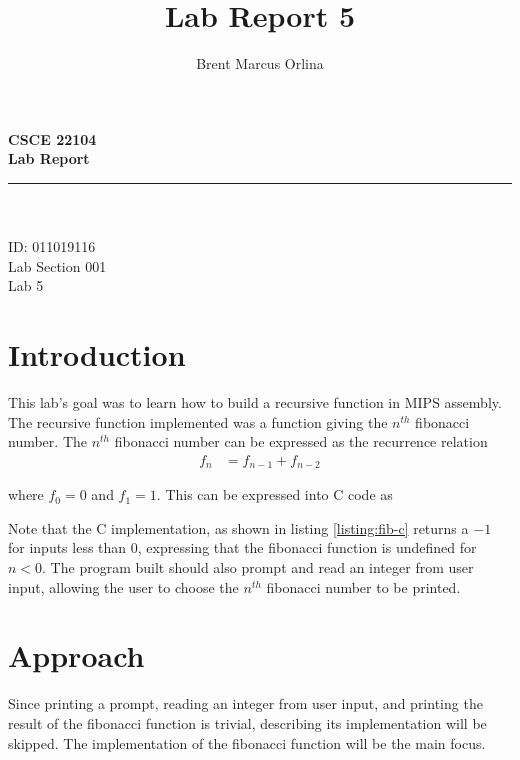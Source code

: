 \documentclass[11pt]{report}
\makeatletter
\newcommand{\@labsection}{000}
\newcommand{\labsection}[1]{
    \renewcommand{\@labsection}{#1}
}
\newcommand{\@labnumber}{0}
\newcommand{\labnumber}[1]{
    \renewcommand{\@labnumber}{#1}
}
\newcommand{\@shortsubmitted}{1/1/70}
\newcommand{\shortsubmitted}[1]{
    \renewcommand{\@shortsubmitted}{#1}
}
\renewcommand{\maketitle}{
    \newgeometry{left=1in, right=1in, top=1.75in, textheight=8.25in}
    \singlespacing
    \begin{center}
        {\huge \bf CSCE 22104} \\
        \vspace{2.5em}
        {\Large \bf Lab Report} \\
        \vspace{2em}
        \noindent\rule{20em}{0.4pt} \\
        \vspace{1em}
        {\Large \@author} \\
        \vspace{.75em}
        {\normalsize ID: 011019116} \\
        \vspace{.75em}
        {\normalsize Lab Section \@labsection} \\
        \vspace{.75em}
        {\normalsize Lab \@labnumber} \\
    \end{center}
    \newpage
    \restoregeometry
}
\makeatother
\begin{document}
\title{Lab Report 5}
\author{Brent Marcus Orlina}

\labsection{001}
\labnumber{5}

\shortsubmitted{3/12/25}

\maketitle

\section*{Introduction}
This lab's goal was to learn how to build a recursive function in MIPS assembly. The recursive
function implemented was a function giving the $n^{th}$ fibonacci number. The $n^{th}$
fibonacci number can be expressed as the recurrence relation
\begin{align*}
    f_n &= f_{n - 1} + f_{n - 2}
\end{align*}

where $f_0 = 0$ and $f_1 = 1$. This can be expressed into C code as


Note that the C implementation, as shown in listing \ref{listing:fib-c} returns a $-1$ for inputs
less than $0$, expressing that the fibonacci function is undefined for $n < 0$. The program built
should also prompt and read an integer from user input, allowing the user to choose the $n^{th}$
fibonacci number to be printed. 

\newpage

\section*{Approach}
Since printing a prompt, reading an integer from user input, and printing the result of the
fibonacci function is trivial, describing its implementation will be skipped. The implementation of
the fibonacci function will be the main focus.

\end{document}

